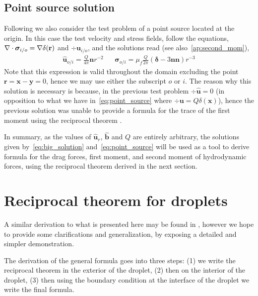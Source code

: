 \subsection{Point source solution}



Following \citet{stone2001inertial} we also consider the test problem of a point source located at the origin.
In this case the test velocity  and stress fields, follow the equations, $\mathbf{\nabla}\cdot\bm\sigma_{i/o}=\mathbf{\nabla} \delta(\textbf{r})$ and $\div \textbf{u}_{i/o}$, and the solutions read \citep{pozrikidis2011introduction,pozrikidis1992boundary} (see also~\ref{ap:second_mom}), 
\begin{align}
    \hat{\textbf{u}}_{o/i} = \frac{Q}{4\pi} \textbf{n}r^{-2}
    && \hat{\bm\sigma}_{o/i} = \mu_f \frac{Q}{2\pi}\left(
        \bm\delta
        - 3 \textbf{nn}
    \right)r^{-3}
    \label{eq:point_source}
\end{align}
Note that this expression is valid throughout the domain excluding the point $\textbf{r} =  \textbf{x} -  \textbf{y} = 0$, hence we may use either the subscript $o$ or $i$. 
The reason why this solution is necessary is because, in the previous test problem $\div \hat{\textbf{u}}= 0$ (in opposition to what we have in~\ref{eq:point_source} where $\div \textbf{u} = Q \delta(\textbf{x})$), hence the previous solution was unable to provide a formula for the trace of the first moment using the reciprocal theorem \citep{stone2001inertial}.

In summary, as the values of $\hat{\textbf{u}}_r$, $\hat{\textbf{b}}$ and $Q$ are entirely arbitrary, the solutions given by~\ref{eq:big_solution} and~\ref{eq:point_source} will be used as a tool to derive formula for the drag forces, first moment, and second moment of hydrodynamic forces, using the reciprocal theorem derived in the next section.  

\section{Reciprocal theorem for droplets}

A similar derivation to what is presented here may be found in \citet{lovalenti1993force,raja2010inertial}, however we hope to provide some clarifications and generalization, by exposing a detailed and simpler demonstration.  

The derivation of the general formula goes into three steps: (1) we write the reciprocal theorem in the exterior of the droplet, (2) then on the interior of the droplet, (3) then using the boundary condition at the interface of the droplet we write the final formula. 

